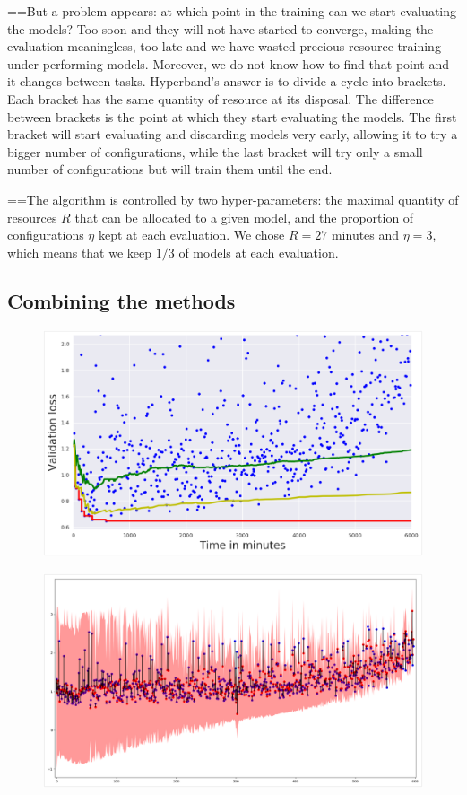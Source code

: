 ==But a problem appears: at which point in the training can we start evaluating the models? Too soon and they will not have started to converge, making the evaluation meaningless, too late and we have wasted precious resource training under-performing models. Moreover, we do not know how to find that point and it changes between tasks. Hyperband's answer is to divide a cycle into brackets. Each bracket has the same quantity of resource at its disposal. The difference between brackets is the point at which they start evaluating the models. The first bracket will start evaluating and discarding models very early, allowing it to try a bigger number of configurations, while the last bracket will try only a small number of configurations but will train them until the end.

==The algorithm is controlled by two hyper-parameters: the maximal quantity of resources $R$ that can be allocated to a given model, and the proportion of configurations $\eta$ kept at each evaluation. We chose $R = 27$ minutes and $\eta = 3$, which means that we keep $1/3$ of models at each evaluation.

\subsection{Combining the methods}

\begin{figure}[htb]
	\centering
	\includegraphics[width=.95\linewidth]{img_hyperopt/bo_acc_time.png}
	\label{fig:bo_acc_time}
\end{figure}

\begin{figure}[htb]
	\centering
	\includegraphics[width=.95\linewidth]{img_hyperopt/bo_error_time.png}
	\label{fig:bo_error_time}
\end{figure}

